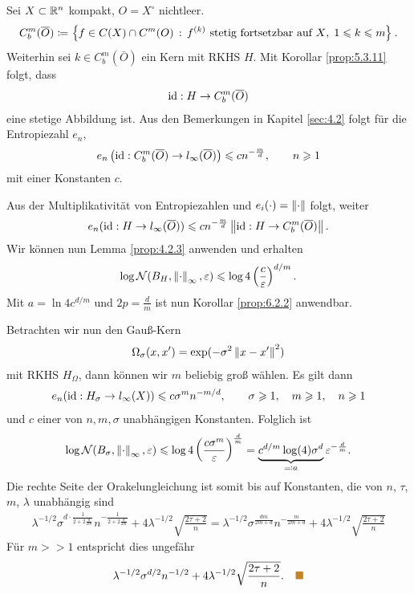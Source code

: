 \begin{bsp*}
Sei $X\subset \mathbb{R}^n$ kompakt, $O = X^\circ$ nichtleer.
\begin{align*}
C_b^m({\overline{O}}) \coloneq
\left\{ f\in C(X)\cap C^m(O)\,:\,f^{(k)} \text{
stetig fortsetzbar auf $X$},\; 1\leqslant k\leqslant m\right\}.
\end{align*}
Weiterhin sei $k\in C_b^m(\bar{O})$ ein Kern mit RKHS $H$. Mit Korollar
\ref{prop:5.3.11} folgt, dass
\begin{align*}
\operatorname{id} : H\to C_b^m({\overline{O}})
\end{align*}
eine stetige Abbildung ist. Aus den Bemerkungen in Kapitel \ref{sec:4.2} folgt
für die Entropiezahl $e_n$,
\begin{align*}
e_n\left(\operatorname{id} : C_b^m({\overline{O}})\to l_\infty({\overline{O}}) \right) \leqslant
cn^{-\frac{m}{d}},\qquad n\geqslant 1
\end{align*}
mit einer Konstanten $c$.

Aus der Multiplikativität von Entropiezahlen und $e_i(\cdot) = \left\|\cdot\right\|$
folgt, weiter
\begin{align*}
e_n(\operatorname{id} : H\to l_\infty({\overline{O}})) \leqslant cn^{-\frac{m}{d}} \left\|\operatorname{id}: H\to
C_b^m({\overline{O}})\right\|.
\end{align*}
Wir können nun
Lemma \ref{prop:4.2.3} anwenden und erhalten
\begin{align*}
\log \mathcal{N}(B_H,\left\|\cdot\right\|_\infty,\varepsilon) \leqslant \log 4
\left(\frac{c}{\varepsilon}\right)^{d/m}.
\end{align*}
Mit $a=\ln 4 c^{d/m}$ und $2p = \frac{d}{m}$ ist nun Korollar \ref{prop:6.2.2}
anwendbar.

Betrachten wir nun den Gauß-Kern
\begin{align*}
\Omega_\sigma(x,x') = \exp(-\sigma^2\left\|x-x'\right\|^2)
\end{align*}
mit RKHS $H_\Omega$, dann können wir $m$ beliebig groß wählen. Es gilt dann
\begin{align*}
e_n(\operatorname{id} : H_\sigma \to l_\infty(X)) \leqslant c \sigma^m n^{-m/d},\qquad \sigma\geqslant
1,\quad m\geqslant 1,\quad n\geqslant 1
\end{align*}
und $c$ einer von $n,m,\sigma$ unabhängigen Konstanten. Folglich ist
\begin{align*}
\log \mathcal{N}(B_\sigma,\left\|\cdot\right\|_\infty,\varepsilon)
\leqslant \log 4
\left(\frac{c\sigma^m}{\varepsilon}\right)^{\frac{d}{m}}
=
\underbrace{c^{d/m}\log( 4) \sigma^d}_{\eqcolon a} \varepsilon^{-\frac{d}{m}}.
\end{align*}
Die rechte Seite der Orakelungleichung ist somit bis auf Konstanten, die von
$n$, $\tau$, $m$, $\lambda$ unabhängig sind
\begin{align*}
\lambda^{-1/2} \sigma^{d\cdot \frac{1}{2+2\frac{d}{2m}}}
n^{-\frac{1}{2+2\frac{d}{2m}}} + 4\lambda^{-1/2}\sqrt{\frac{2\tau + 2}{n}}
= \lambda^{-1/2}\sigma^{\frac{dm}{2m+d}}n^{-\frac{m}{2m+d}}+
4\lambda^{-1/2}\sqrt{\frac{2\tau + 2}{n}}
\end{align*}
Für $m>>1$ entspricht dies ungefähr
\begin{align*}
\lambda^{-1/2}\sigma^{d/2}n^{-1/2} +
4\lambda^{-1/2}\sqrt{\frac{2\tau+2}{n}}.\bsphere
\end{align*}
\end{bsp*}

